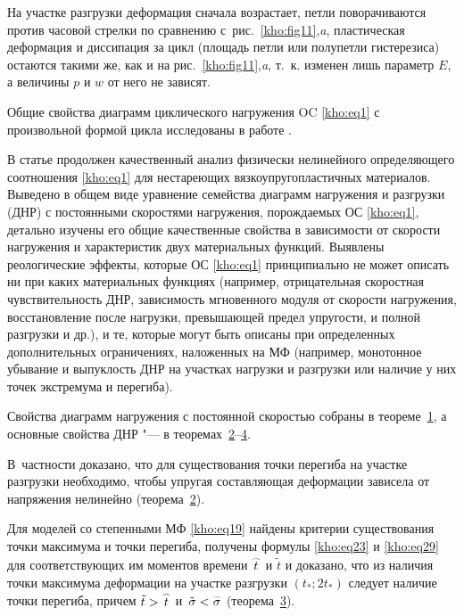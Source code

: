 На участке разгрузки деформация сначала возрастает, петли поворачиваются против часовой стрелки по сравнению с~рис.~\ref{kho:fig11},{\sl a}, пластическая деформация и диссипация за цикл (площадь петли или полупетли гистерезиса) остаются такими же, как и на рис.~\ref{kho:fig11},{\sl a}, т.~к. изменен лишь параметр $E$, а величины $p$ и $w$ от него не зависят. 



Общие свойства диаграмм циклического нагружения OC \eqref{kho:eq1} с произвольной формой цикла исследованы в работе \cite{kho:bib7}.



\smallskip



 В статье продолжен качественный анализ физически нелинейного определяющего соотношения \eqref{kho:eq1} для нестареющих вязкоупругопластичных материалов. Выведено в общем виде уравнение семейства диаграмм нагружения и разгрузки (ДНР) с постоянными скоростями нагружения, порождаемых ОС \eqref{kho:eq1}, детально изучены его общие качественные свойства в зависимости от скорости нагружения и характеристик двух материальных функций. Выявлены реологические эффекты, которые ОС \eqref{kho:eq1} принципиально не может описать ни при каких материальных функциях (например, отрицательная скоростная чувствительность ДНР, зависимость мгновенного модуля от скорости нагружения, восстановление после нагрузки, превышающей предел упругости, и полной разгрузки и др.), и те, которые могут быть описаны при определенных дополнительных ограничениях, наложенных на МФ (например, монотонное убывание и выпуклость ДНР на участках нагрузки и разгрузки или наличие у них точек экстремума и перегиба). 

Свойства диаграмм нагружения с постоянной скоростью  собраны в теореме~\hyperlink{kh:th1}{1}, а основные свойства ДНР "--- в теоремах~\hyperlink{kh:th2}{2}--\hyperlink{kh:th4}{4}. 

В~частности доказано, что для существования точки перегиба на участке разгрузки необходимо, чтобы упругая составляющая деформации зависела от напряжения нелинейно (теорема~\hyperlink{kh:th2}{2}). 

Для моделей со степенными МФ \eqref{kho:eq19} найдены критерии существования точки максимума и точки перегиба, получены формулы \eqref{kho:eq23} и \eqref{kho:eq29} для соответствующих им моментов времени $\mathord{\buildrel{\lower3pt\hbox{$\scriptscriptstyle\frown$}}\over{t}}$ и $\tilde{t}$ и доказано, что из наличия точки максимума деформации на участке разгрузки $(t_\ast;2t_\ast)$ следует наличие точки перегиба, причем $\tilde{t}>\mathord{\buildrel{\lower3pt\hbox{$\scriptscriptstyle\frown$}}\over{t}}$ и~$\tilde{\sigma}<\mathord{\buildrel{\lower3pt\hbox{$\scriptscriptstyle\frown$}}\over{\sigma}}$ (теорема~\hyperlink{kh:th3}{3}). 

